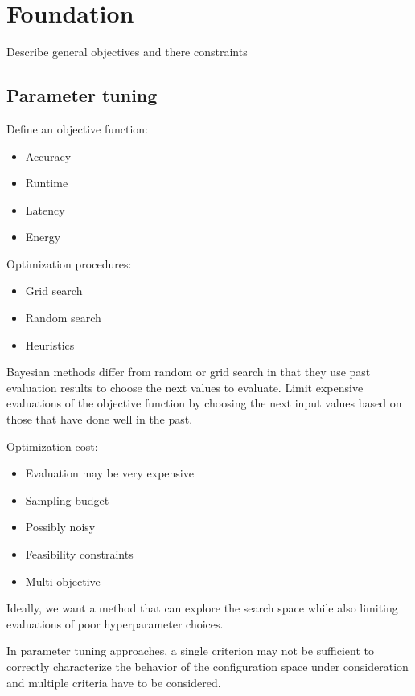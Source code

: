 \chapter{Foundation}
    Describe general objectives and there constraints

    \section{Parameter tuning}
        Define an objective function: 
        \begin{itemize}
            \item Accuracy
            \item Runtime
            \item Latency
            \item Energy
        \end{itemize}

        Optimization procedures:
        \begin{itemize}
            \item Grid search
            \item Random search
            \item Heuristics
        \end{itemize}
        Bayesian methods differ from random or grid search in that they use past evaluation results to choose the next values to evaluate.
        Limit expensive evaluations of the objective function by choosing the next input values based on those that have done well in the past.

        Optimization cost:
        \begin{itemize}
            \item Evaluation may be very expensive
            \item Sampling budget
            \item Possibly noisy
            \item Feasibility constraints
            \item Multi-objective
        \end{itemize}
        Ideally, we want a method that can explore the search space while also limiting evaluations of poor hyperparameter choices.

        In parameter tuning approaches, a single criterion may not be sufficient to correctly characterize the behavior of the 
        configuration space under consideration and multiple criteria have to be considered.

